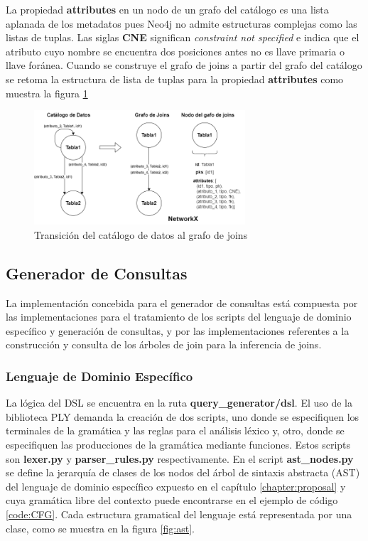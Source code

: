 La propiedad \textbf{attributes} en un nodo de un grafo del catálogo es una lista aplanada de los metadatos 
pues Neo4j no admite estructuras complejas 
como las listas de tuplas. Las siglas \textbf{CNE} significan \emph{constraint not specified} 
e indica que el atributo cuyo nombre se encuentra dos posiciones antes no es llave primaria o 
llave for\'anea. Cuando se construye el grafo de joins a partir del grafo del catálogo se retoma 
la estructura de lista de tuplas para la propiedad \textbf{attributes} como muestra la figura 
\ref{fig:catalog-jgraph}

\begin{figure}[H]
    \centering
    \includegraphics[width=0.7\textwidth]{Graphics/catalog-jgraph.drawio.png}
    \caption{Transición del catálogo de datos al grafo de joins}
    \label{fig:catalog-jgraph}
\end{figure}

\subsection{Generador de Consultas}

La implementación concebida para el generador de consultas est\'a compuesta por las implementaciones para el tratamiento de los scripts del lenguaje de 
dominio específico y generación de consultas, y por las implementaciones referentes a la construcci\'on 
y consulta de los \'arboles de join para la inferencia de joins.



\subsubsection{Lenguaje de Dominio Espec\'ifico}

La lógica del DSL se encuentra en la ruta \textbf{query\_generator/dsl}. El uso de la biblioteca 
PLY demanda la creación de dos scripts, uno donde se especifiquen los terminales de la gramática y las reglas 
para el análisis léxico y, otro, donde se especifiquen las producciones de la gramática mediante funciones. Estos 
scripts son \textbf{lexer.py} y \textbf{parser\_rules.py} respectivamente. En el script \textbf{ast\_nodes.py} se define  
la jerarquía de clases de los nodos del \'arbol de sintaxis abstracta (AST) del lenguaje de dominio específico expuesto 
en el capítulo \ref{chapter:proposal} y cuya gramática libre del contexto puede encontrarse en el ejemplo de 
c\'odigo \ref{code:CFG}. Cada 
estructura gramatical del lenguaje est\'a representada por una clase, como se muestra en la figura \ref{fig:ast}.

